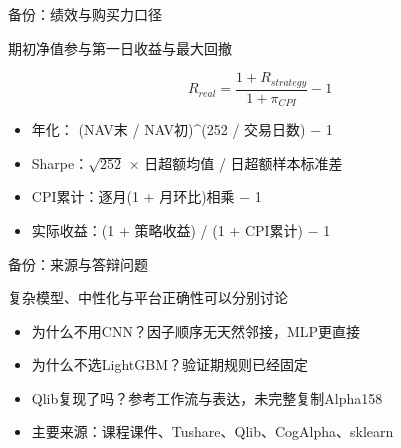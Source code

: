 \documentclass[aspectratio=169,10pt]{beamer}
\begin{document}
\begin{frame}{备份：绩效与购买力口径}
\begin{block}{}期初净值参与第一日收益与最大回撤\end{block}
\[R_{real}=\frac{1+R_{strategy}}{1+\pi_{CPI}}-1\]
\small\begin{itemize}
\item 年化： (NAV末 / NAV初)\textasciicircum{}(252 / 交易日数) $-$ 1
\item Sharpe：$\sqrt{252}$ $\times$ 日超额均值 / 日超额样本标准差
\item CPI累计：逐月(1 + 月环比)相乘 $-$ 1
\item 实际收益：(1 + 策略收益) / (1 + CPI累计) $-$ 1
\end{itemize}
\end{frame}

\begin{frame}{备份：来源与答辩问题}
\begin{block}{}复杂模型、中性化与平台正确性可以分别讨论\end{block}
\small\begin{itemize}
\item 为什么不用CNN？因子顺序无天然邻接，MLP更直接
\item 为什么不选LightGBM？验证期规则已经固定
\item Qlib复现了吗？参考工作流与表达，未完整复制Alpha158
\item 主要来源：课程课件、Tushare、Qlib、CogAlpha、sklearn
\end{itemize}
\end{frame}
\end{document}
